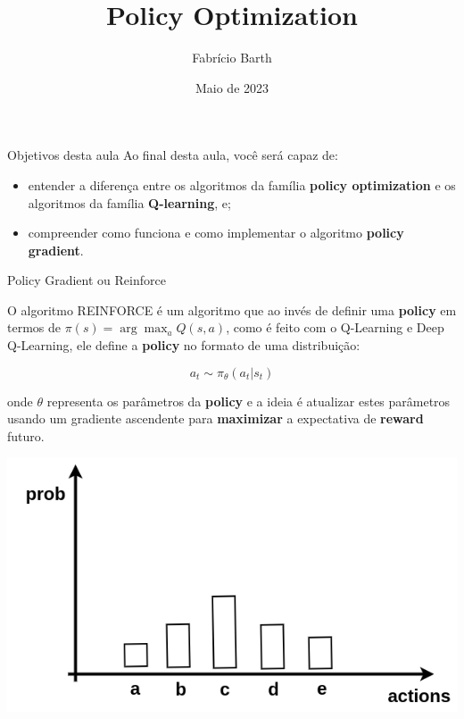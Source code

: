 \documentclass{beamer}
\begin{document}
	
\title{Policy Optimization} 
\author{Fabrício Barth}
\date{Maio de 2023}
	
\maketitle

\def\HiLi{\leavevmode\rlap{\hbox to \hsize{\color{yellow!50}\leaders\hrule height .8\baselineskip depth .5ex\hfill}}}
	
\begin{frame}{Objetivos desta aula}
	Ao final desta aula, você será capaz de: 
		
	\begin{itemize}
		\item entender a diferença entre os algoritmos da família \textbf{policy optimization} e os algoritmos da família \textbf{Q-learning}, e; 
		\item compreender como funciona e como implementar o algoritmo \textbf{policy gradient}. 
	\end{itemize}
\end{frame}

\begin{frame}{Policy Gradient ou Reinforce}
	
	O algoritmo REINFORCE é um algoritmo que ao invés de definir uma \textbf{policy} em termos de $\pi(s) = \arg \max_{a} Q(s,a)$, como é feito com o Q-Learning e Deep Q-Learning, ele define a \textbf{policy} no formato de uma distribuição: 
	
	\begin{equation}
	a_{t} \sim \pi_{\theta}(a_{t} | s_{t})
	\end{equation}	
	
	onde $\theta$ representa os parâmetros da \textbf{policy} e a ideia é atualizar estes parâmetros usando um gradiente ascendente para \textbf{maximizar} a expectativa de \textbf{reward} futuro.
\end{frame}


\begin{frame}
	\begin{center}
		\includegraphics[width=.9\textwidth]{img/distribuicao.png}
	\end{center}
\end{frame}
\end{document}

